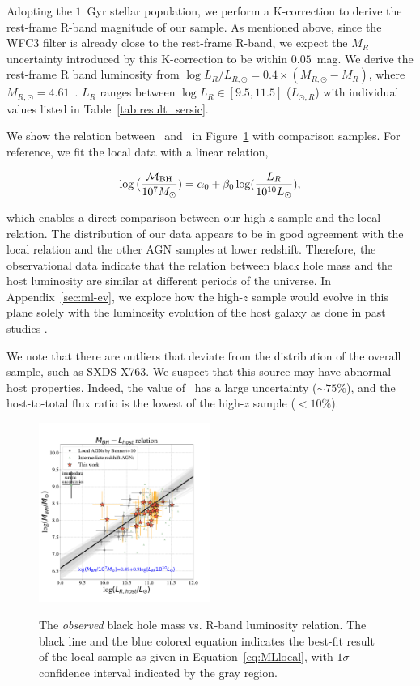 \documentclass[apj]{emulateapj}
\begin{document}
Adopting the $1$~Gyr stellar population, we perform a K-correction to derive the rest-frame R-band magnitude of our sample. As mentioned above, since the WFC3 filter is already close to the rest-frame R-band, we expect the $M_R$ uncertainty introduced by this K-correction to be within $0.05$~mag. We derive the rest-frame R band luminosity from $\log L_R/L_{R, \odot} = 0.4\times(M_{R, \odot}-M_R)$, where $M_{R, \odot}=4.61$~\citep{Blanton07}. $L_R$ ranges between $\log L_R \in [9.5, 11.5]$ ($L_{\odot,R}$) with individual values listed in Table~\ref{tab:result_sersic}. 

We show the relation between \mbh\ and \lhost\ in Figure~\ref{fig:ML} with comparison samples. For reference, we fit the local data with a linear relation,

\begin{eqnarray}
\label{eq:MLlocal}
\log \big( \frac{\mathcal M_{\rm BH}}{10^{7}M_{\odot}})= \alpha_0 + \beta_0 \log(\frac{L_R}{10^{10}L_{\odot}}),
\end {eqnarray}

\noindent which enables a direct comparison between our high-$z$ sample and the local relation. The distribution of our data appears to be in good agreement with the local relation and the other AGN samples at lower redshift. Therefore, the observational data indicate that the relation between black hole mass and the host luminosity are similar at different periods of the universe. In Appendix~\ref{sec:ml-ev}, we explore how the high-$z$  sample would evolve in this plane solely with the luminosity evolution of the host galaxy as done in past studies \citep[e.g., ][]{Ding2017b}. 

We note that there are outliers that deviate from the distribution of the overall sample, such as SXDS-X763. We suspect that this source may have abnormal host properties. Indeed, the value of \Reff\ has a large uncertainty ($\sim 75\%$), and the host-to-total flux ratio is the lowest of the high-$z$ sample ($<10\%$). 

\begin{figure}
\centering
{\includegraphics[width=0.5\textwidth]{fig/MBH-L_obs.pdf}}
\caption{\label{fig:ML} 
The {\it observed} black hole mass vs. R-band luminosity relation. The black line and the blue colored equation indicates the best-fit result of the local sample as given in Equation~\ref{eq:MLlocal}, with $1\sigma$ confidence interval indicated by the gray region.
}
\end{figure} 
\end{document}
